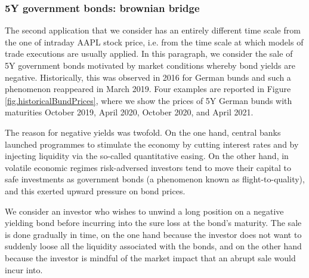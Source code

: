 \documentclass[10pt,a4paper]{article}
\begin{document}
\subsubsection{5Y government bonds: brownian bridge}
The second application that we consider has an entirely different time scale from the one of intraday AAPL stock price, i.e. from the time scale at which models of trade executions are usually applied. In this  paragraph, we consider the sale of 5Y government bonds motivated by market conditions whereby bond yields are negative. Historically, this was observed in 2016 for German bunds and such a phenomenon reappeared in March 2019. Four examples are reported in Figure \ref{fig.historicalBundPrices}, where we show the prices of 5Y German bunds with maturities October 2019, April 2020, October 2020, and April 2021.

The reason for negative yields was twofold. On the one hand, central banks launched programmes to stimulate the economy by cutting interest rates and by injecting liquidity via the so-called quantitative easing. On the other hand, in volatile economic regimes risk-adversed investors tend to move their capital to safe investments as government bonds (a phenomenon known as flight-to-quality), and this exerted upward pressure on bond prices.  

We consider an investor who wishes to unwind a long position on a negative yielding bond before incurring into the sure loss at the bond's maturity. The sale is done gradually in time, on the one hand because the investor does not want to suddenly loose all the liquidity associated with the bonds, and on the other hand because the investor is mindful of the market impact that an abrupt sale would incur into.  
\end{document}
